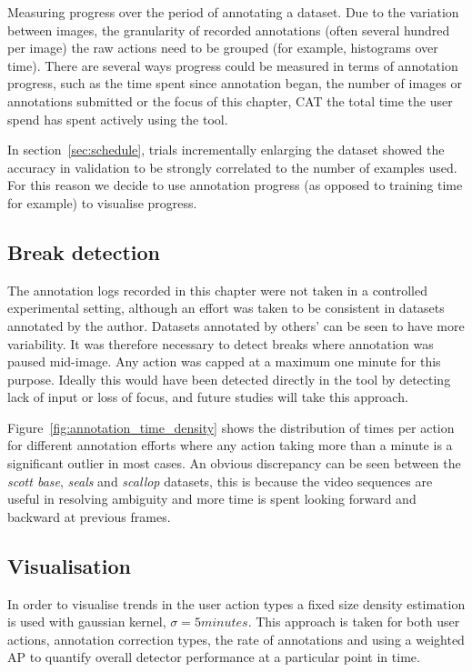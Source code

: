 Measuring progress over the period of annotating a dataset. Due to the variation between images, the granularity of recorded annotations (often several hundred per image) the raw actions need to be grouped (for example, histograms over time). There are several ways progress could be measured in terms of annotation progress, such as the time spent since annotation began, the number of images or annotations submitted or the focus of this chapter, \gls{CAT} the total time the user spend has spent actively using the tool.

In section~\ref{sec:schedule}, trials incrementally enlarging the dataset showed the accuracy in validation to be strongly correlated to the number of examples used. For this reason we decide to use annotation progress (as opposed to training time for example) to visualise progress.

\subsection {Break detection}
\label{sec:break_detection}

The annotation logs recorded in this chapter were not taken in a controlled experimental setting, although an effort was taken to be consistent in datasets annotated by the author. Datasets annotated by others' can be seen to have more variability. It was therefore necessary to detect breaks where annotation was paused mid-image. Any action was capped at a maximum one minute for this purpose. Ideally this would have been detected directly in the tool by detecting lack of input or loss of focus, and future studies will take this approach. 

Figure~\ref{fig:annotation_time_density} shows the distribution of times per action for different annotation efforts where any action taking more than a minute is a significant outlier in most cases. An obvious discrepancy can be seen between the \emph{scott base}, \emph{seals} and \emph{scallop} datasets, this is because the video sequences are useful in resolving ambiguity and more time is spent looking forward and backward at previous frames.

\subsection{Visualisation}
\label{sec:visualisation}

In order to visualise trends in the user action types a fixed size density estimation is used with gaussian kernel, $\sigma=5 minutes$. This approach is taken for both user actions, annotation correction types, the rate of annotations and using a weighted \gls{AP} to quantify overall detector performance at a particular point in  time.

